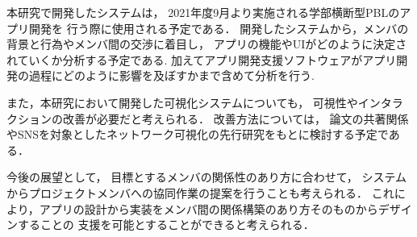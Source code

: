 
本研究で開発したシステムは，
2021年度9月より実施される学部横断型PBLのアプリ開発を
行う際に使用される予定である．
開発したシステムから，メンバの背景と行為やメンバ間の交渉に着目し，
アプリの機能やUIがどのように決定されていくか分析する予定である.
加えてアプリ開発支援ソフトウェアがアプリ開発の過程にどのように影響を及ぼすかまで含めて分析を行う.

また，本研究において開発した可視化システムについても，
可視性やインタラクションの改善が必要だと考えられる．
改善方法については，
論文の共著関係やSNSを対象としたネットワーク可視化の先行研究をもとに検討する予定である．

今後の展望として，
目標とするメンバの関係性のあり方に合わせて，
システムからプロジェクトメンバへの協同作業の提案を行うことも考えられる．
これにより，アプリの設計から実装をメンバ間の関係構築のあり方そのものからデザインすることの
支援を可能とすることができると考えられる．
